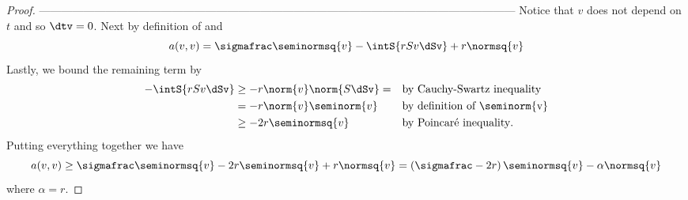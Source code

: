 \begin{prop}
\begin{proof}
        
        ---------------------------------------------------------------------------------------------------------------------------------
        Notice that $v$ does not depend on $t$ and so $\dtv = 0$. Next by definition of  and 
        \begin{equation*}
            a(v,v) = \sigmafrac \seminormsq{v} - \intS{r S v \dSv} + r \normsq{v}
        \end{equation*}
        Lastly, we bound the remaining term by
        \begin{align*}
            - \intS{r S v \dSv} &\geq -r \norm{v} \norm{S\dSv} = && \text{by Cauchy-Swartz inequality}\\
            &= -r \norm{v} \seminorm{v} && \text{by definition of \seminorm{v}}\\
            &\geq -2r \seminormsq{v} && \text{by Poincaré inequality}.
        \end{align*}
        Putting everything together we have
        \begin{equation*}
            a(v,v) \geq \sigmafrac \seminormsq{v} -2r \seminormsq{v} + r \normsq{v} = \left(\sigmafrac - 2r\right)\seminormsq{v} - \alpha \normsq{v}
        \end{equation*}
        where $\alpha = r$. \qedhere
    \end{proof}
\end{prop}



